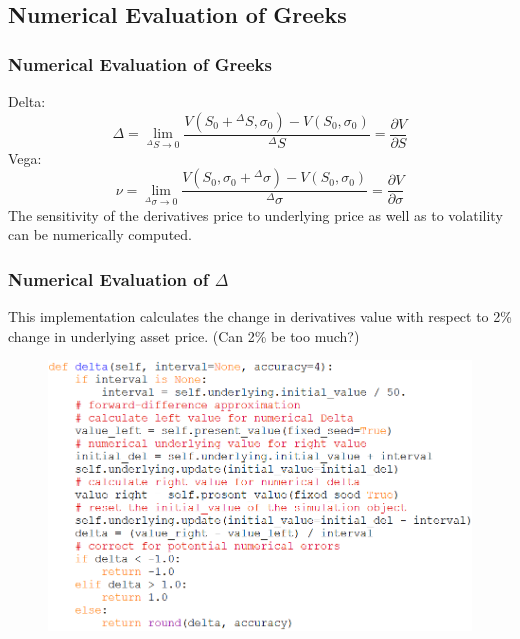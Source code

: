 \documentclass{beamer}
\begin{document}
\subsection{Numerical Evaluation of Greeks}
\begin{frame}
\frametitle{Numerical Evaluation of Greeks}
Delta:
$$\Delta = \lim_{{^{\Delta}S} \to 0} \frac{V(S_{0}+{^{\Delta}S},\sigma_{0}) - V(S_{0}, \sigma_{0})}{^{\Delta}S} = \frac{\partial V}{\partial S}$$
Vega:
$$\nu = \lim_{{^{\Delta}\sigma} \to 0} \frac{V(S_{0},\sigma_{0}+{^{\Delta}\sigma}) - V(S_{0}, \sigma_{0})}{^{\Delta}\sigma} = \frac{\partial V}{\partial \sigma}$$
The sensitivity of the derivatives price to underlying price as well as to volatility can be numerically computed.
\end{frame}

\begin{frame}
\frametitle{Numerical Evaluation of $\Delta$}
This implementation calculates the change in derivatives value with respect to 2\% change in underlying asset price. (Can 2\% be too much?)
\begin{figure}[H]
	\includegraphics[scale=0.44]{delta_valuation_class.png}
\end{figure}
\end{frame}
\end{document}
